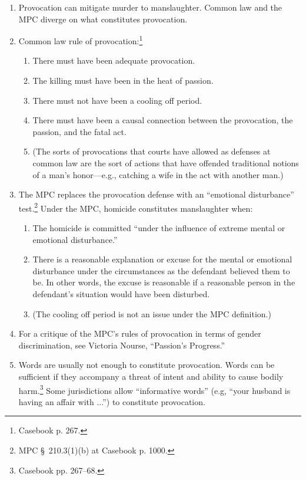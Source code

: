 \begin{enumerate}
    \item Provocation can mitigate murder to manslaughter. Common law and the MPC diverge on what constitutes provocation.
    \item Common law rule of provocation:\footnote{Casebook p. 267.}
    \begin{enumerate}
        \item There must have been adequate provocation.
        \item The killing must have been in the heat of passion.
        \item There must not have been a cooling off period.
        \item There must have been a causal connection between the provocation, the passion, and the fatal act.
        \item (The sorts of provocations that courts have allowed as defenses at common law are the sort of actions that have offended traditional notions of a man's honor---e.g., catching a wife in the act with another man.)
    \end{enumerate}
    \item The MPC replaces the provocation defense with an ``emotional disturbance'' test.\footnote{MPC § 210.3(1)(b) at Casebook p. 1000.} Under the MPC, homicide constitutes manslaughter when:
    \begin{enumerate}
        \item The homicide is committed ``under the influence of extreme mental or emotional disturbance.''
        \item There is a reasonable explanation or excuse for the mental or emotional disturbance under the circumstances as the defendant believed them to be. In other words, the excuse is reasonable if a reasonable person in the defendant's situation would have been disturbed.
        \item (The cooling off period is not an issue under the MPC definition.)
    \end{enumerate}
    \item For a critique of the MPC's rules of provocation in terms of gender discrimination, see Victoria Nourse, ``Passion's Progress.''
    \item Words are usually not enough to constitute provocation. Words can be sufficient if they accompany a threat of intent and ability to cause bodily harm.\footnote{Casebook pp. 267--68.} Some jurisdictions allow ``informative words'' (e.g, ``your husband is having an affair with ...'') to constitute provocation.
\end{enumerate}

